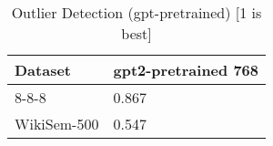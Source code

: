 \begin{table}[]
\centering
\begin{tabular}{l|l}
\hline
Dataset & gpt2-pretrained 768 \\
\hline
8-8-8 & 0.867 \\ 
WikiSem-500 & 0.547
\end{tabular}
\caption{Outlier Detection (gpt-pretrained) [1 is best]}
\label{tab:outlier-gpt-pretrained}
\end{table}
